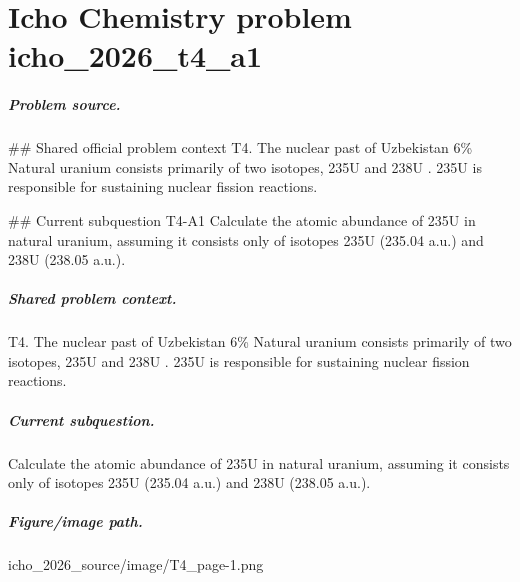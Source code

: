 
\chapter{Icho Chemistry problem icho\_2026\_t4\_a1}
\label{ch:IChO2026Problems_problem_icho_2026_t4_a1}

\paragraph{Problem source.}
\#\# Shared official problem context
T4. The nuclear past of Uzbekistan 6\% Natural uranium consists primarily of two isotopes, 235U and 238U . 235U is responsible for sustaining nuclear fission reactions.

\#\# Current subquestion T4-A1
Calculate the atomic abundance of 235U in natural uranium, assuming it consists only of isotopes 235U (235.04 a.u.) and 238U (238.05 a.u.).

\paragraph{Shared problem context.}
T4. The nuclear past of Uzbekistan 6\% Natural uranium consists primarily of two isotopes, 235U and 238U . 235U is responsible for sustaining nuclear fission reactions.

\paragraph{Current subquestion.}
Calculate the atomic abundance of 235U in natural uranium, assuming it consists only of isotopes 235U (235.04 a.u.) and 238U (238.05 a.u.).

\paragraph{Figure/image path.}
icho\_2026\_source/image/T4\_page-1.png

